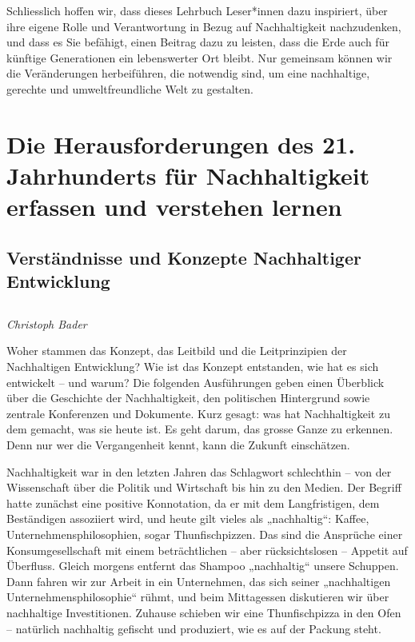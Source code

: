\documentclass[
  nswissgerman,
  a4paper,
  openany]{book}
\begin{document}
Schliesslich hoffen wir, dass dieses Lehrbuch Leser*innen dazu
inspiriert, über ihre eigene Rolle und Verantwortung in Bezug auf
Nachhaltigkeit nachzudenken, und dass es Sie befähigt, einen Beitrag
dazu zu leisten, dass die Erde auch für künftige Generationen ein
lebenswerter Ort bleibt. Nur gemeinsam können wir die Veränderungen
herbeiführen, die notwendig sind, um eine nachhaltige, gerechte und
umweltfreundliche Welt zu gestalten.

\part{Die Herausforderungen des 21. Jahrhunderts für Nachhaltigkeit
erfassen und verstehen lernen}

\chapter{Verständnisse und Konzepte Nachhaltiger
Entwicklung}\label{verstuxe4ndnisse-und-konzepte-nachhaltiger-entwicklung}

\chapter*{}\label{section}

\markboth{}{}

\emph{Christoph Bader}

Woher stammen das Konzept, das Leitbild und die Leitprinzipien der
Nachhaltigen Entwicklung? Wie ist das Konzept entstanden, wie hat es
sich entwickelt -- und warum? Die folgenden Ausführungen geben einen
Überblick über die Geschichte der Nachhaltigkeit, den politischen
Hintergrund sowie zentrale Konferenzen und Dokumente. Kurz gesagt: was
hat Nachhaltigkeit zu dem gemacht, was sie heute ist. Es geht darum, das
grosse Ganze zu erkennen. Denn nur wer die Vergangenheit kennt, kann die
Zukunft einschätzen.

Nachhaltigkeit war in den letzten Jahren das Schlagwort schlechthin --
von der Wissenschaft über die Politik und Wirtschaft bis hin zu den
Medien. Der Begriff hatte zunächst eine positive Konnotation, da er mit
dem Langfristigen, dem Beständigen assoziiert wird, und heute gilt
vieles als „nachhaltig``: Kaffee, Unternehmensphilosophien, sogar
Thunfischpizzen. Das sind die Ansprüche einer Konsumgesellschaft mit
einem beträchtlichen -- aber rücksichtslosen -- Appetit auf Überfluss.
Gleich morgens entfernt das Shampoo „nachhaltig`` unsere Schuppen. Dann
fahren wir zur Arbeit in ein Unternehmen, das sich seiner „nachhaltigen
Unternehmensphilosophie`` rühmt, und beim Mittagessen diskutieren wir
über nachhaltige Investitionen. Zuhause schieben wir eine Thunfischpizza
in den Ofen -- natürlich nachhaltig gefischt und produziert, wie es auf
der Packung steht.
\end{document}
